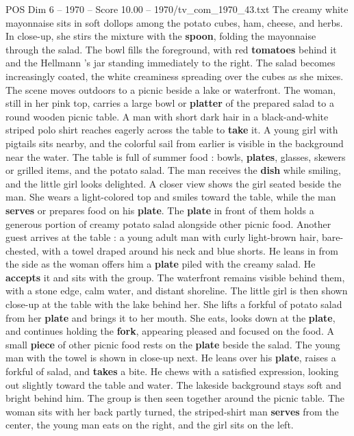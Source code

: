\begin{textsample}{POS Dim 6 – 1970 – Score 10.00 – 1970/tv\_com\_1970\_43.txt}
The creamy white mayonnaise sits in soft dollops among the potato cubes, ham, cheese, and herbs.
In close-up, she stirs the mixture with the \textbf{spoon}, folding the mayonnaise through the salad.
The bowl fills the foreground, with red \textbf{tomatoes} behind it and the Hellmann ’s jar standing immediately to the right.
The salad becomes increasingly coated, the white creaminess spreading over the cubes as she mixes.
The scene moves outdoors to a picnic beside a lake or waterfront.
The woman, still in her pink top, carries a large bowl or \textbf{platter} of the prepared salad to a round wooden picnic table.
A man with short dark hair in a black-and-white striped polo shirt reaches eagerly across the table to \textbf{take} it.
A young girl with pigtails sits nearby, and the colorful sail from earlier is visible in the background near the water.
The table is full of summer food : bowls, \textbf{plates}, glasses, skewers or grilled items, and the potato salad.
The man receives the \textbf{dish} while smiling, and the little girl looks delighted.
A closer view shows the girl seated beside the man.
She wears a light-colored top and smiles toward the table, while the man \textbf{serves} or prepares food on his \textbf{plate}.
The \textbf{plate} in front of them holds a generous portion of creamy potato salad alongside other picnic food.
Another guest arrives at the table : a young adult man with curly light-brown hair, bare-chested, with a towel draped around his neck and blue shorts.
He leans in from the side as the woman offers him a \textbf{plate} piled with the creamy salad.
He \textbf{accepts} it and sits with the group.
The waterfront remains visible behind them, with a stone edge, calm water, and distant shoreline.
The little girl is then shown close-up at the table with the lake behind her.
She lifts a forkful of potato salad from her \textbf{plate} and brings it to her mouth.
She eats, looks down at the \textbf{plate}, and continues holding the \textbf{fork}, appearing pleased and focused on the food.
A small \textbf{piece} of other picnic food rests on the \textbf{plate} beside the salad.
The young man with the towel is shown in close-up next.
He leans over his \textbf{plate}, raises a forkful of salad, and \textbf{takes} a bite.
He chews with a satisfied expression, looking out slightly toward the table and water.
The lakeside background stays soft and bright behind him.
The group is then seen together around the picnic table.
The woman sits with her back partly turned, the striped-shirt man \textbf{serves} from the center, the young man eats on the right, and the girl sits on the left.

\end{textsample}
